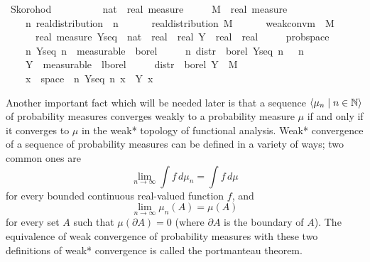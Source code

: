 \documentclass[leqno]{article}
\theoremstyle{definition}
\newcommand{\bldseq}[2]{\langle{#1}\mid{#2}\rangle}
\begin{document}
\begin{isabellebody}
\isamarkupfalse%
\ Skorohod{\isacharcolon}\isanewline
\ \ \ \isanewline
\ \ \ \ {\isasymmu}\ {\isacharcolon}{\isacharcolon}\ {\isachardoublequoteopen}nat\ {\isasymRightarrow}\ real\ measure{\isachardoublequoteclose}\ \isanewline
\ \ \ \ M\ {\isacharcolon}{\isacharcolon}\ {\isachardoublequoteopen}real\ measure{\isachardoublequoteclose}\isanewline
\ \ \ \isanewline
\ \ \ \ {\isachardoublequoteopen}{\isasymAnd}n{\isachardot}\ real{\isacharunderscore}distribution\ {\isacharparenleft}{\isasymmu}\ n{\isacharparenright}{\isachardoublequoteclose}\ \ \isanewline
\ \ \ \ {\isachardoublequoteopen}real{\isacharunderscore}distribution\ M{\isachardoublequoteclose}\ \ \isanewline
\ \ \ \ {\isachardoublequoteopen}weak{\isacharunderscore}conv{\isacharunderscore}m\ {\isasymmu}\ M{\isachardoublequoteclose}\isanewline
\ \ \ {\isachardoublequoteopen}{\isasymexists}\ {\isacharparenleft}{\isasymOmega}\ {\isacharcolon}{\isacharcolon}\ real\ measure{\isacharparenright}\ {\isacharparenleft}Y{\isacharunderscore}seq\ {\isacharcolon}{\isacharcolon}\ nat\ {\isasymRightarrow}\ real\ {\isasymRightarrow}\ real{\isacharparenright}\ {\isacharparenleft}Y\ {\isacharcolon}{\isacharcolon}\ real\ {\isasymRightarrow}\ real{\isacharparenright}{\isachardot}\ \isanewline
\ \ \ \ prob{\isacharunderscore}space\ {\isasymOmega}\ {\isasymand}\isanewline
\ \ \ \ {\isacharparenleft}{\isasymforall}n{\isachardot}\ Y{\isacharunderscore}seq\ n\ {\isasymin}\ measurable\ {\isasymOmega}\ borel{\isacharparenright}\ {\isasymand}\isanewline
\ \ \ \ {\isacharparenleft}{\isasymforall}n{\isachardot}\ distr\ {\isasymOmega}\ borel\ {\isacharparenleft}Y{\isacharunderscore}seq\ n{\isacharparenright}\ {\isacharequal}\ {\isasymmu}\ n{\isacharparenright}\ {\isasymand}\isanewline
\ \ \ \ Y\ {\isasymin}\ measurable\ {\isasymOmega}\ lborel\ {\isasymand}\isanewline
\ \ \ \ distr\ {\isasymOmega}\ borel\ Y\ {\isacharequal}\ M\ {\isasymand}\isanewline
\ \ \ \ {\isacharparenleft}{\isasymforall}x\ {\isasymin}\ space\ {\isasymOmega}{\isachardot}\ {\isacharparenleft}{\isasymlambda}n{\isachardot}\ Y{\isacharunderscore}seq\ n\ x{\isacharparenright}\ {\isacharminus}{\isacharminus}{\isacharminus}{\isacharminus}{\isachargreater}\ Y\ x{\isacharparenright}{\isachardoublequoteclose}
\end{isabellebody}

\medskip

Another important fact which will be needed later is that a sequence $\bldseq{\mu_n}{n \in \N}$ of probability measures converges weakly to a probability measure $\mu$ if and only if it converges to $\mu$ in the weak* topology of functional analysis. Weak* convergence of a sequence of probability measures can be defined in a variety of ways; two common ones are
\[ \lim_{n \rightarrow \infty} \int f \, d\mu_n = \int f \, d\mu \]
for every bounded continuous real-valued function $f$, and
\[ \lim_{n \rightarrow \infty} \mu_n(A) = \mu(A) \]
for every set $A$ such that $\mu(\partial A) = 0$ (where $\partial A$ is the boundary of $A$). The equivalence of weak convergence of probability measures with these two definitions of weak* convergence is called the portmanteau theorem.
\end{document}
